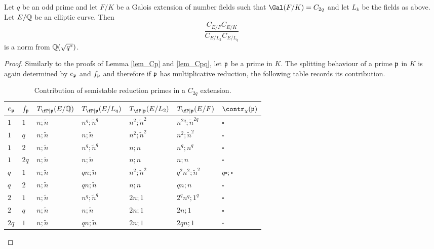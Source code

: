 \begin{lemma}\label{lem_C2p}
    Let $q$ be an odd prime and let $F/K$ be a Galois extension of number fields such that $\Gal(F/K)=C_{2q}$ and let $L_k$ be the fields as above. Let $E/\mathbb{Q}$ be an elliptic curve. Then
    $$\frac{C_{E/F}C_{E/K}}{C_{E/L_2}C_{E/L_q}}$$
    is a norm from $\mathbb{Q}(\sqrt{q^*})$.
\end{lemma}

\begin{proof}
    Similarly to the proofs of Lemma \ref{lem_Cp} and \ref{lem_Cpq}, let $\mathfrak{p}$ be a prime in $K$. The splitting behaviour of a prime $\mathfrak{p}$ in $K$ is again determined by $e_{\mathfrak{p}}$ and $f_{\mathfrak{p}}$ and therefore if $\mathfrak{p}$ has multiplicative reduction, the following table records its contribution.

    \begin{table}[!ht]
        \centering
        \begin{tabular}{|l|l|l|l|l|l|l|}
        \hline
        $e_{\mathfrak{p}}$ & $f_{\mathfrak{p}}$  & $T_{\fP\mid \pp}(E/\QQ)$ & $T_{\fP\mid \pp}(E/L_q)$ & $T_{\fP\mid \pp}(E/L_2)$ & $T_{\fP\mid \pp}(E/F)$ & $\contr_\chi(\pp)$ \\ \hline
        $1$ & $1$ & $n;\tilde{n}$ & $n^q;\tilde{n}^q$ & $n^2;\tilde{n}^2$ & $n^{2q};\tilde{n}^{2q}$ & $\square$ \\ \hline
        $1$ & $q$ & $n;\tilde{n}$ & $n;\tilde{n}$ & $n^2;\tilde{n}^2$ & $n^2;\tilde{n}^2$ & $\square$ \\ \hline
        $1$ & $2$ & $n;\tilde{n}$ & $n^q;\tilde{n}^q$ & $n;n$ & $n^q;n^q$ & $\square$ \\ \hline
        $1$ & $2q$ & $n;\tilde{n}$ & $n;\tilde{n}$ & $n;n$ & $n;n$ & $\square$ \\ \hline
        $q$ & $1$ & $n;\tilde{n}$ & $qn;\tilde{n}$ & $n^2;\tilde{n}^2$ & $q^2n^2;\tilde{n}^2$ & $q\square;\square$ \\ \hline
        $q$ & $2$ & $n;\tilde{n}$ & $qn;\tilde{n}$ & $n;n$ & $qn;n$ & $\square$ \\ \hline
        $2$ & $1$ & $n;\tilde{n}$ & $n^q;\tilde{n}^q$ & $2n;1$ & $2^qn^q;1^q$ & $\square$ \\ \hline
        $2$ & $q$ & $n;\tilde{n}$ & $n;\tilde{n}$ & $2n;1$ & $2n;1$ & $\square$ \\ \hline
        $2q$ & $1$ & $n;\tilde{n}$ & $qn;\tilde{n}$ & $2n;1$ & $2qn;1$ & $\square$ \\ \hline
        \end{tabular}
        \caption{Contribution of semistable reduction primes in a $C_{2q}$ extension.}
    \end{table}


\end{proof}
